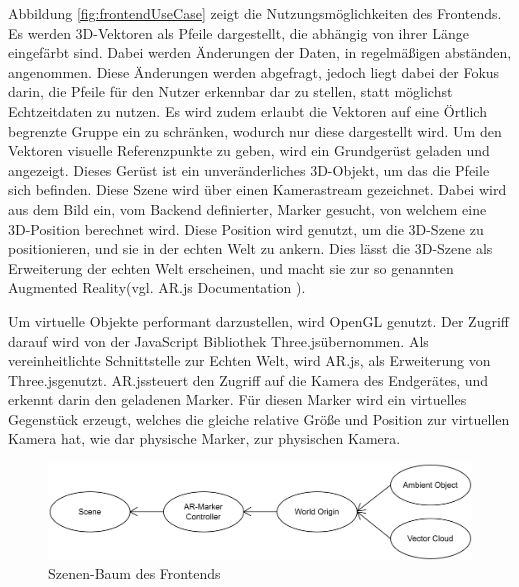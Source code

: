 Abbildung \ref{fig:frontendUseCase} zeigt die Nutzungsmöglichkeiten
des Frontends. Es werden 3D-Vektoren als Pfeile dargestellt,
die abhängig von ihrer Länge eingefärbt sind. Dabei werden
Änderungen der Daten, in regelmäßigen abständen, angenommen. Diese
Änderungen werden abgefragt, jedoch liegt dabei der Fokus darin, die
Pfeile für den Nutzer erkennbar dar zu stellen, statt möglichst
Echtzeitdaten zu nutzen. Es wird zudem erlaubt die Vektoren auf eine
Örtlich begrenzte Gruppe ein zu schränken, wodurch nur diese
dargestellt wird. Um den Vektoren visuelle Referenzpunkte zu geben,
wird ein Grundgerüst geladen und angezeigt. Dieses Gerüst ist ein
unveränderliches 3D-Objekt, um das die Pfeile sich befinden.
Diese Szene wird über einen Kamerastream gezeichnet. Dabei wird
aus dem Bild ein, vom Backend definierter, Marker gesucht,
von welchem eine 3D-Position berechnet wird. Diese Position wird
genutzt, um die 3D-Szene zu positionieren, und sie in der echten
Welt zu ankern. Dies lässt die 3D-Szene als Erweiterung der echten
Welt erscheinen, und macht sie zur so genannten \grqq Augmented
Reality\grqq\space (vgl. AR.js Documentation \cite{ARjsDoc}).

Um virtuelle Objekte performant darzustellen, wird OpenGL genutzt.
Der Zugriff darauf wird von der JavaScript Bibliothek
\grqq Three.js\grqq\space übernommen. Als vereinheitlichte
Schnittstelle zur Echten Welt, wird \grqq AR.js\grqq , als
Erweiterung von \grqq Three.js\grqq\space genutzt.
\grqq AR.js\grqq\space steuert den Zugriff auf die Kamera des
Endgerätes, und erkennt darin den geladenen Marker. Für diesen
Marker wird ein virtuelles Gegenstück erzeugt, welches die
gleiche relative Größe und Position zur virtuellen Kamera hat,
wie dar physische Marker, zur physischen Kamera.

\begin{figure}
	\centering
	\includegraphics[width=1\linewidth]{images/frontend/SceneTree}
	\caption{Szenen-Baum des Frontends}
	\label{fig:SceneTree}
\end{figure}

